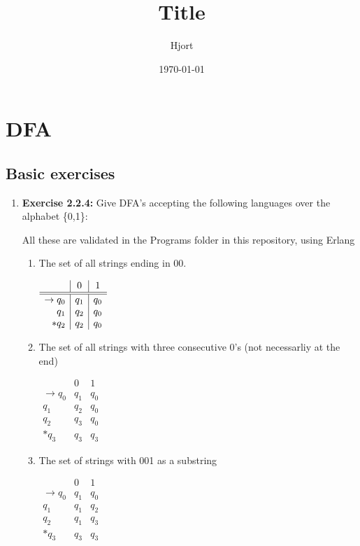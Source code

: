 \documentclass{article}
\title{Title}
\date{\today}
\author{Hjort}
\begin{document}
\maketitle

\section*{DFA}
\subsection*{Basic exercises}

\begin{enumerate}
    \item \textbf{Exercise 2.2.4:} Give DFA's accepting the following languages over the alphabet \{0,1\}:

        All these are validated in the Programs folder in this repository, using Erlang
        
        \begin{enumerate}
            \item The set of all strings ending in $00$.

                $
                \begin{array}{r | c | c}
                        & 0 & 1 \\ \hline \hline
                    \to q_0 & q_1 & q_0 \\
                        q_1 & q_2 & q_0\\
                        *q_2 & q_2 & q_0
                \end{array}
                $

            \item The set of all strings with three consecutive 0's (not necessarliy at the end)

                $ \begin{array}{r|c|c}
                            & 0 & 1 \\ \hline \hline
                    \to q_0 & q_1 & q_0 \\
                    q_1 & q_2 & q_0 \\
                    q_2 & q_3 & q_0 \\
                    *q_3 & q_3 & q_3
                \end{array}
                $

            \item The set of strings with 001 as a substring

                $ \begin{array}{r|c|c}
                            & 0 & 1 \\ \hline \hline
                    \to q_0 & q_1 & q_0 \\
                    q_1 & q_1 & q_2 \\
                    q_2 & q_1 & q_3 \\
                    *q_3 & q_3 & q_3
                \end{array}
                $

        \end{enumerate}
\end{enumerate}
\end{document}
